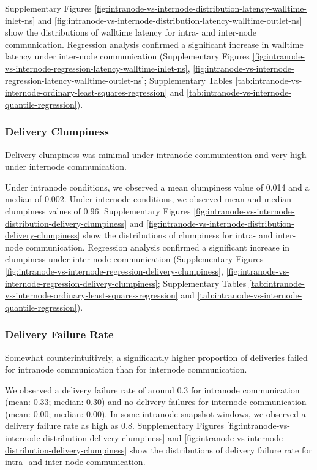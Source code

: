 Supplementary Figures \ref{fig:intranode-vs-internode-distribution-latency-walltime-inlet-ns} and \ref{fig:intranode-vs-internode-distribution-latency-walltime-outlet-ns} show the distributions of walltime latency for intra- and inter-node communication.
Regression analysis confirmed a significant increase in walltime latency under inter-node communication (Supplementary Figures \ref{fig:intranode-vs-internode-regression-latency-walltime-inlet-ns}, \ref{fig:intranode-vs-internode-regression-latency-walltime-outlet-ns}; Supplementary Tables \ref{tab:intranode-vs-internode-ordinary-least-squares-regression} and \ref{tab:intranode-vs-internode-quantile-regression}).

\subsubsection{Delivery Clumpiness}

Delivery clumpiness was minimal under intranode communication and very high under internode communication.

Under intranode conditions, we observed a mean clumpiness value of 0.014 and a median of 0.002.
Under internode conditions, we observed mean and median clumpiness values of 0.96.
Supplementary Figures \ref{fig:intranode-vs-internode-distribution-delivery-clumpiness} and \ref{fig:intranode-vs-internode-distribution-delivery-clumpiness} show the distributions of clumpiness for intra- and inter-node communication.
Regression analysis confirmed a significant increase in clumpiness under inter-node communication (Supplementary Figures \ref{fig:intranode-vs-internode-regression-delivery-clumpiness}, \ref{fig:intranode-vs-internode-regression-delivery-clumpiness}; Supplementary Tables \ref{tab:intranode-vs-internode-ordinary-least-squares-regression} and \ref{tab:intranode-vs-internode-quantile-regression}).

\subsubsection{Delivery Failure Rate}

Somewhat counterintuitively, a significantly higher proportion of deliveries failed for intranode communication than for internode communication.

We observed a delivery failure rate of around 0.3 for intranode communication (mean: 0.33; median: 0.30) and no delivery failures for internode communication (mean: 0.00; median: 0.00).
In some intranode snapshot windows, we observed a delivery failure rate as high as 0.8.
Supplementary Figures \ref{fig:intranode-vs-internode-distribution-delivery-clumpiness} and \ref{fig:intranode-vs-internode-distribution-delivery-clumpiness} show the distributions of delivery failure rate for intra- and inter-node communication.


